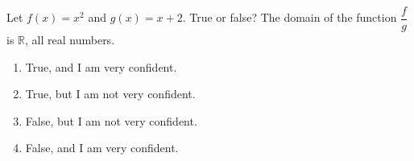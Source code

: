 
\bigskip

\item Let $f(x) = x^2$ and $g(x) = x + 2$.  True or false?  The domain of the function $\dfrac{f}{g}$ is $\mathbb{R}$, all real numbers.
	
	\begin{enumerate}
		\item True, and I am very confident.
		\item True, but I am not very confident.
		\item False, but I am not very confident.
		\item False, and I am very confident.
	\end{enumerate}
	

